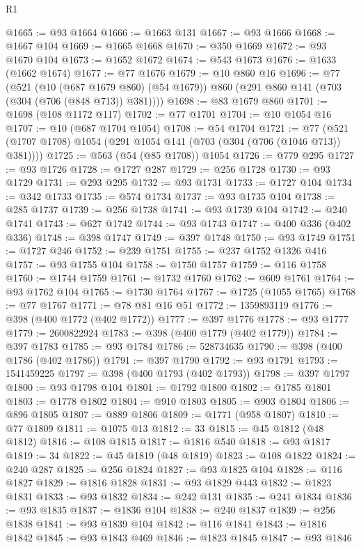 \begin{lexlean}{R1}
\begin{coremodule}
@1665 := @93 @1664
@1666 := @1663 @131
@1667 := @93 @1666
@1668 := @1667 @104
@1669 := @1665 @1668
@1670 := @350 @1669
@1672 := @93 @1670 @104
@1673 := @1652 @1672
@1674 := @543 @1673
@1676 := @1633 (@1662 @1674)
@1677 := @77 @1676
@1679 := @10 @860 @16
@1696 := @77
    (@521
      (@10 (@687 @1679 @860) (@54 @1679))
      @860
      (@291 @860 @141 (@703 (@304 (@706 (@848 @713)) @381))))
@1698 := @83 @1679 @860
@1701 := @1698 (@108 @1172 @117)
@1702 := @77 @1701
@1704 := @10 @1054 @16
@1707 := @10 (@687 @1704 @1054)
@1708 := @54 @1704
@1721 := @77 (@521 (@1707 @1708) @1054 (@291 @1054 @141 (@703 (@304 (@706 (@1046 @713)) @381))))
@1725 := @563 (@54 (@85 @1708)) @1054
@1726 := @779 @295
@1727 := @93 @1726
@1728 := @1727 @287
@1729 := @256 @1728
@1730 := @93 @1729
@1731 := @293 @295
@1732 := @93 @1731
@1733 := @1727 @104
@1734 := @342 @1733
@1735 := @574 @1734
@1737 := @93 @1735 @104
@1738 := @285 @1737
@1739 := @256 @1738
@1741 := @93 @1739 @104
@1742 := @240 @1741
@1743 := @627 @1742
@1744 := @93 @1743
@1747 := @400 @336 (@402 @336)
@1748 := @398 @1747
@1749 := @397 @1748
@1750 := @93 @1749
@1751 := @1727 @246
@1752 := @239 @1751
@1755 := @237 @1752 @1326 @416
@1757 := @93 @1755 @104
@1758 := @1750 @1757
@1759 := @116 @1758
@1760 := @1744 @1759
@1761 := @1732 @1760
@1762 := @609 @1761
@1764 := @93 @1762 @104
@1765 := @1730 @1764
@1767 := @1725 (@1055 @1765)
@1768 := @77 @1767
@1771 := @78 @81 @16 @51
@1772 := 1359893119
@1776 := @398 (@400 @1772 (@402 @1772))
@1777 := @397 @1776
@1778 := @93 @1777
@1779 := 2600822924
@1783 := @398 (@400 @1779 (@402 @1779))
@1784 := @397 @1783
@1785 := @93 @1784
@1786 := 528734635
@1790 := @398 (@400 @1786 (@402 @1786))
@1791 := @397 @1790
@1792 := @93 @1791
@1793 := 1541459225
@1797 := @398 (@400 @1793 (@402 @1793))
@1798 := @397 @1797
@1800 := @93 @1798 @104
@1801 := @1792 @1800
@1802 := @1785 @1801
@1803 := @1778 @1802
@1804 := @910 @1803
@1805 := @903 @1804
@1806 := @896 @1805
@1807 := @889 @1806
@1809 := @1771 (@958 @1807)
@1810 := @77 @1809
@1811 := @1075 @13
@1812 := 33
@1815 := @45 @1812 (@48 @1812)
@1816 := @108 @1815
@1817 := @1816 @540
@1818 := @93 @1817
@1819 := 34
@1822 := @45 @1819 (@48 @1819)
@1823 := @108 @1822
@1824 := @240 @287
@1825 := @256 @1824
@1827 := @93 @1825 @104
@1828 := @116 @1827
@1829 := @1816 @1828
@1831 := @93 @1829 @443
@1832 := @1823 @1831
@1833 := @93 @1832
@1834 := @242 @131
@1835 := @241 @1834
@1836 := @93 @1835
@1837 := @1836 @104
@1838 := @240 @1837
@1839 := @256 @1838
@1841 := @93 @1839 @104
@1842 := @116 @1841
@1843 := @1816 @1842
@1845 := @93 @1843 @469
@1846 := @1823 @1845
@1847 := @93 @1846

\end{coremodule}
\end{lexlean}
